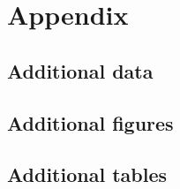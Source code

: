 \chapter{Appendix}\label{ch:appendix_b}

\section{Additional data}

\section{Additional figures}

\section{Additional tables}
